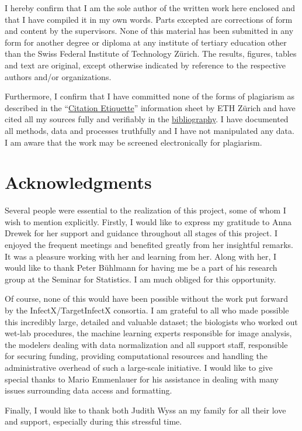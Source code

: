 I hereby confirm that I am the sole author of the written work here enclosed and that I have compiled it in my own words. Parts excepted are corrections of form and content by the supervisors. None of this material has been submitted in any form for another degree or diploma at any institute of tertiary education other than the Swiss Federal Institute of Technology Z\"urich. The results, figures, tables and text are original, except otherwise indicated by reference to the respective authors and/or organizations.

Furthermore, I confirm that I have committed none of the forms of plagiarism as described in the ``\href{https://www.ethz.ch/content/dam/ethz/main/education/rechtliches-abschluesse/leistungskontrollen/plagiarism-citationetiquette.pdf}{Citation Etiquette}'' information sheet by ETH Z\"urich and have cited all my sources fully and verifiably in the \hyperref[ch:bibliography]{bibliography}. I have documented all methods, data and processes truthfully and I have not manipulated any data. I am aware that the work may be screened electronically for plagiarism.

\section*{Acknowledgments}

Several people were essential to the realization of this project, some of whom I wish to mention explicitly. Firstly, I would like to express my gratitude to Anna Drewek for her support and guidance throughout all stages of this project. I enjoyed the frequent meetings and benefited greatly from her insightful remarks. It was a pleasure working with her and learning from her. Along with her, I would like to thank Peter B\"uhlmann for having me be a part of his research group at the Seminar for Statistics. I am much obliged for this opportunity.

Of course, none of this would have been possible without the work put forward by the InfectX/TargetInfectX consortia. I am grateful to all who made possible this incredibly large, detailed and valuable dataset; the biologists who worked out wet-lab procedures, the machine learning experts responsible for image analysis, the modelers dealing with data normalization and all support staff, responsible for securing funding, providing computational resources and handling the administrative overhead of such a large-scale initiative. I would like to give special thanks to Mario Emmenlauer for his assistance in dealing with many issues surrounding data access and formatting.

Finally, I would like to thank both Judith Wyss an my family for all their love and support, especially during this stressful time.
